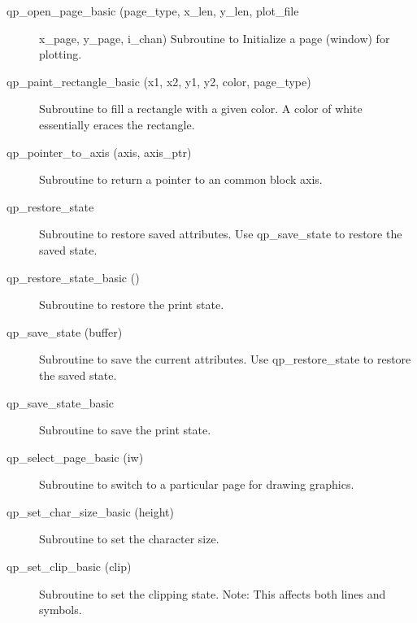 \begin{description}
\label{r:qp.open.page.basic}
\item[qp_open_page_basic (page_type, x_len, y_len, plot_file] \Newline 
      x_page, y_page, i_chan)
Subroutine to Initialize a page (window) for plotting.

\label{r:qp.paint.rectangle.basic}
\item[qp_paint_rectangle_basic (x1, x2, y1, y2, color, page_type)] \Newline 
Subroutine to fill a rectangle with a given color. 
A color of white essentially eraces the rectangle.

\label{r:qp.pointer.to.axis}
\item[qp_pointer_to_axis (axis, axis_ptr)] \Newline 
Subroutine to return a pointer to an common block axis.

\label{r:qp.restore.state}
\item[qp_restore_state] \Newline 
     Subroutine to restore saved attributes. 
     Use qp_save_state to restore the saved state.

\label{r:qp.restore.state.basic}
\item[qp_restore_state_basic ()] \Newline 
Subroutine to restore the print state.

\label{r:qp.save.state}
\item[qp_save_state (buffer)] \Newline 
     Subroutine to save the current attributes. 
     Use qp_restore_state to restore the saved state.

\label{r:qp.save.state.basic}
\item[qp_save_state_basic ] \Newline 
Subroutine to save the print state.

\label{r:qp.select.page.basic}
\item[qp_select_page_basic (iw)] \Newline 
Subroutine to switch to a particular page for drawing graphics.

\label{r:qp.set.char.size.basic}
\item[qp_set_char_size_basic (height)] \Newline 
Subroutine to set the character size.

\label{r:qp.set.clip.basic}
\item[qp_set_clip_basic (clip)] \Newline 
Subroutine to set the clipping state.
Note: This affects both lines and symbols.


\end{description}
